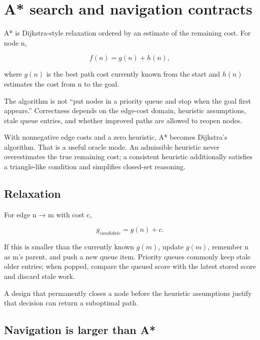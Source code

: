 \hypertarget{appendix-5803241aa1a5}{}\label{referencestart:appendix-5803241aa1a5}
\section{A* search and navigation contracts}\label{appendix-5803241aa1a5-a-search-and-navigation-contracts}

\hypertarget{appendix-5803241aa1a5-a-search-and-navigation-contracts}{}

A* is Dijkstra-style relaxation ordered by an estimate of the remaining cost. For node n,

\[
f(n)=g(n)+h(n),
\]

where \(g(n)\) is the best path cost currently known from the start and \(h(n)\) estimates the cost from n to the goal.

The algorithm is not ``put nodes in a priority queue and stop when the goal first appears.'' Correctness depends on the edge-cost domain, heuristic assumptions, stale queue entries, and whether improved paths are allowed to reopen nodes.

With nonnegative edge costs and a zero heuristic, A* becomes Dijkstra's algorithm. That is a useful oracle mode. An admissible heuristic never overestimates the true remaining cost; a consistent heuristic additionally satisfies a triangle-like condition and simplifies closed-set reasoning.

\subsection{Relaxation}\label{appendix-5803241aa1a5-relaxation}

\hypertarget{appendix-5803241aa1a5-relaxation}{}

For edge n → m with cost c,

\[
g_{candidate}=g(n)+c.
\]

If this is smaller than the currently known \(g(m)\), update \(g(m)\), remember n as m's parent, and push a new queue item. Priority queues commonly keep stale older entries; when popped, compare the queued score with the latest stored score and discard stale work.

A design that permanently closes a node before the heuristic assumptions justify that decision can return a suboptimal path.

\subsection{Navigation is larger than A*}\label{appendix-5803241aa1a5-navigation-is-larger-than-a}

